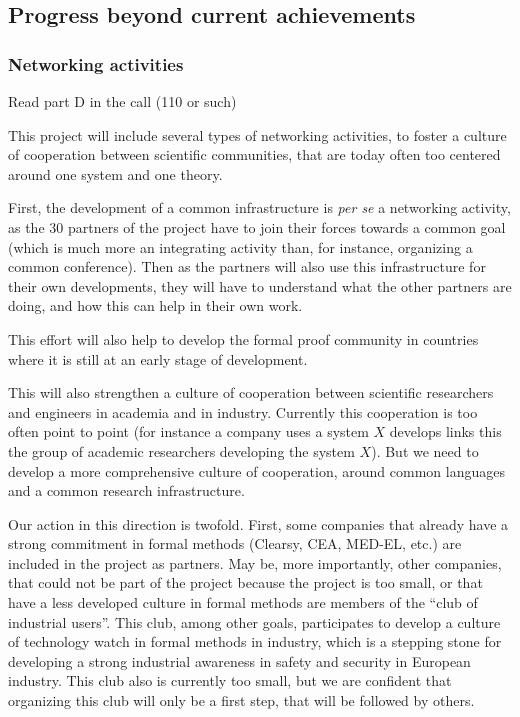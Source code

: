 \subsection{Progress beyond current achievements}

\subsubsection{Networking activities}

{\color{red} Read part D in the call (110 or such)}

This project will include several types of networking activities, to
foster a culture of cooperation between scientific communities, that
are today often too centered around one system and one theory.

First, the development of a common infrastructure is \emph{per se} a
networking activity, as the 30 partners of the project have to join
their forces towards a common goal (which is much more an integrating
activity than, for instance, organizing a common conference). Then as
the partners will also use this infrastructure for their own developments, 
they will have to understand what the other partners are doing, and how this 
can help in their own work. 

This effort will also help to develop the formal proof community in
countries where it is still at an early stage of development.

This will also strengthen a culture of cooperation between scientific
researchers and engineers in academia and in industry. Currently this
cooperation is too often point to point (for instance a company uses a
system $X$ develops links this the group of academic researchers
developing the system $X$). But we need to develop a more
comprehensive culture of cooperation, around common languages and a
common research infrastructure.

Our action in this direction is twofold. First, some companies that
already have a strong commitment in formal methods (Clearsy, CEA,
MED-EL, etc.) are included in the project as partners. May be, more
importantly, other companies, that could not be part of the project
because the project is too small, or that have a less developed
culture in formal methods are members of the ``club of industrial
users''. This club, among other goals, participates to develop a
culture of technology watch in formal methods in industry, which is a
stepping stone for developing a strong industrial awareness in safety
and security in European industry. This club also is currently too
small, but we are confident that organizing this club will only be a
first step, that will be followed by others.

